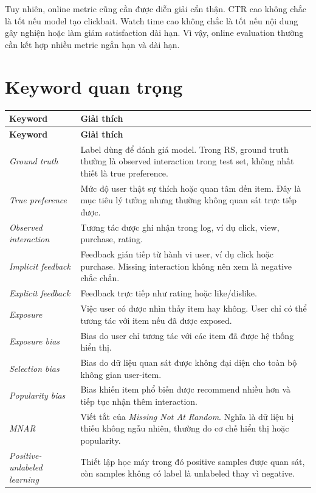 \documentclass[12pt,a4paper]{article}
\begin{document}
Tuy nhiên, online metric cũng cần được diễn giải cẩn thận. CTR cao không chắc là tốt nếu model tạo clickbait. Watch time cao không chắc là tốt nếu nội dung gây nghiện hoặc làm giảm satisfaction dài hạn. Vì vậy, online evaluation thường cần kết hợp nhiều metric ngắn hạn và dài hạn.

\section{Keyword quan trọng}

\begin{longtable}{p{4cm} p{9cm}}
\toprule
\textbf{Keyword} & \textbf{Giải thích} \\
\midrule
\endfirsthead
\toprule
\textbf{Keyword} & \textbf{Giải thích} \\
\midrule
\endhead
\textit{Ground truth} & Label dùng để đánh giá model. Trong RS, ground truth thường là observed interaction trong test set, không nhất thiết là true preference. \\
\textit{True preference} & Mức độ user thật sự thích hoặc quan tâm đến item. Đây là mục tiêu lý tưởng nhưng thường không quan sát trực tiếp được. \\
\textit{Observed interaction} & Tương tác được ghi nhận trong log, ví dụ click, view, purchase, rating. \\
\textit{Implicit feedback} & Feedback gián tiếp từ hành vi user, ví dụ click hoặc purchase. Missing interaction không nên xem là negative chắc chắn. \\
\textit{Explicit feedback} & Feedback trực tiếp như rating hoặc like/dislike. \\
\textit{Exposure} & Việc user có được nhìn thấy item hay không. User chỉ có thể tương tác với item nếu đã được exposed. \\
\textit{Exposure bias} & Bias do user chỉ tương tác với các item đã được hệ thống hiển thị. \\
\textit{Selection bias} & Bias do dữ liệu quan sát được không đại diện cho toàn bộ không gian user-item. \\
\textit{Popularity bias} & Bias khiến item phổ biến được recommend nhiều hơn và tiếp tục nhận thêm interaction. \\
\textit{MNAR} & Viết tắt của \textit{Missing Not At Random}. Nghĩa là dữ liệu bị thiếu không ngẫu nhiên, thường do cơ chế hiển thị hoặc popularity. \\
\textit{Positive-unlabeled learning} & Thiết lập học máy trong đó positive samples được quan sát, còn samples không có label là unlabeled thay vì negative. \\

\end{longtable}
\end{document}
